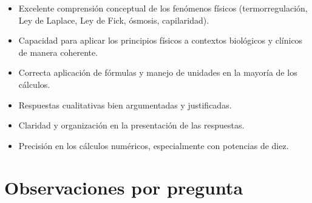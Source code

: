 \documentclass[11pt,a4paper]{article}
\begin{document}
\vspace{4pt}
\begin{minipage}[t]{0.48\linewidth}
  \begin{tcolorbox}[cajaFortaleza, title={Fortalezas}]
\begin{itemize}[leftmargin=1.5em, itemsep=2pt]
  \item Excelente comprensión conceptual de los fenómenos físicos (termorregulación, Ley de Laplace, Ley de Fick, ósmosis, capilaridad).
  \item Capacidad para aplicar los principios físicos a contextos biológicos y clínicos de manera coherente.
  \item Correcta aplicación de fórmulas y manejo de unidades en la mayoría de los cálculos.
  \item Respuestas cualitativas bien argumentadas y justificadas.
  \item Claridad y organización en la presentación de las respuestas.
\end{itemize}
  \end{tcolorbox}
\end{minipage}
\hfill
\begin{minipage}[t]{0.48\linewidth}
  \begin{tcolorbox}[cajaMejora, title={Areas de mejora}]
\begin{itemize}[leftmargin=1.5em, itemsep=2pt]
  \item Precisión en los cálculos numéricos, especialmente con potencias de diez.
\end{itemize}
  \end{tcolorbox}
\end{minipage}

\section*{Observaciones por pregunta}
\end{document}
